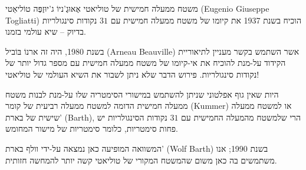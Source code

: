 \begin{surferPage}{משטח ממעלה חמישית של טוליאטי}
    אֶאוּגֶ'ניוֹ ג'יוּזֶפֶּה טוֹליאַטי (Eugenio Giuseppe Togliatti) הוכיח בשנת 1937 את קיומו של משטח ממעלה חמישית עם $31$ נקודות סינגולריות בדיוק – שיא עולמי בזמנו.


    בשנת 1980, היה זה ארנוֹ בּוֹביל (Arneau Beauville) אשר השתמש בקשר מעניין לתיאוריית
    הקידוד על-מנת להוכיח את אי-קיומו של משטח ממעלה חמישית עם מספר גדול יותר של
    נקודות סינגולריות. 
    פירוש הדבר שלא ניתן לשבור את השיא העולמי של טוליאטי!

    היות שאין גוף אפלטוני שניתן להשתמש במישורי הסימטריה שלו על-מנת
    לבנות משטח ממעלה חמישית הדומה למשטח ממעלה רביעית של קומר (Kummer)
    או למשטח ממעלה שישית של בארת' (Barth), הרי שלמשטח מהמעלה החמישית עם $31$ נקודות הסינגולריות יש פחות סימטריות,
    כלומר סימטריות של מישור המחומש.


 המשוואה המופיעה כאן נמצאה על-ידי וולף בארת' (Wolf Barth) בשנת 1990; אנו משתמשים בה כאן
    משום שהמשטח המקורי של טוליאטי קשה יותר להמחשה חזותית.
\end{surferPage}
